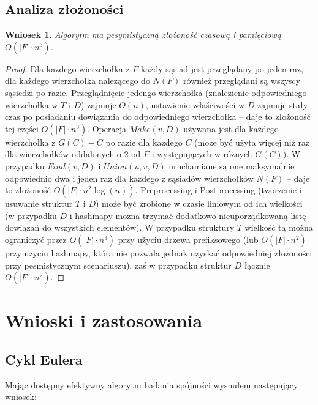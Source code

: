 \documentclass{pracamgr}
\newtheorem{corollary}[theorem]{Wniosek}
\begin{document}
   \subsection{Analiza złożoności}
    \begin{corollary}\label{zlozonosc lokalnej spojnosci}
     Algorytm ma pesymistyczną złożoność czasową i pamięciową $O(|F|\cdot n^3)$.
    \end{corollary}
    \begin{proof}
     Dla kazdego wierzchołka z $F$ każdy sąsiad jest przeglądany po jeden raz, dla każdego wierzchołka nalezącego do $N(F)$ również przeglądani są wszyscy sąsiedzi
     po razie. Przeglądnięcie jedengo wierzchołka (znalezienie odpowiedniego wierzchołka w $T$ i $D$) zajmuje $O(n)$,
     ustawienie właściwości w $D$ zajmuje stały czas po posiadaniu dowiązania do odpowiedniego wierzchołka -- daje to złożoność tej części $O(|F|\cdot n^3)$.\newline
     Operacja $Make(v,D)$ używana jest dla każdego wierzchołka z $G(C)-C$ po razie dla kazdego $C$
     (moze być użyta więcej niż raz dla wierzchołków oddalonych o 2 od $F$ i występujących w różnych $G(C)$).
     W przypadku $Find(v,D)$ i $Union(u,v,D)$ uruchamiane są one maksymalnie odpowiednio dwa i jeden raz dla kazdego z sąsiadów wierzchołków $N(F)$
     -- daje to złożoność $O(|F|\cdot n^2\log(n))$.\newline
     Preprocessing i Postprocessing (tworzenie i usuwanie struktur $T$ i $D$)
     może być zrobione w czasie liniowym od ich wielkości (w przypadku $D$ i hashmapy można trzymać dodatkowo nieuporządkowaną listę dowiązań do wszystkich
     elementów). W przypadku struktury $T$ wielkość tą można ograniczyć przez $O(|F|\cdot n^3)$ przy użyciu drzewa prefiksowego
     (lub $O(|F|\cdot n^2)$ przy użyciu hashmapy, która nie pozwala jednak uzyskać odpowiedniej złożoności przy pesmistycznym scenariuszu),
     zaś w przypadku struktur $D$ łącznie $O(|F|\cdot n^2)$.
    \end{proof}
  \section{Wnioski i zastosowania}
   \subsection{Cykl Eulera}
    Mając dostępny efektywny algorytm badania spójności wysnułem następujący wniosek: 
 
\end{document}
